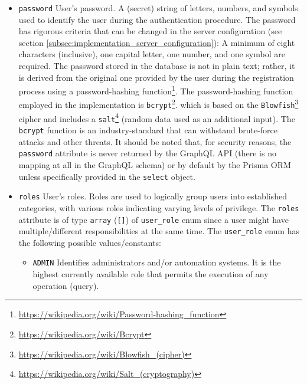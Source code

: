 \begin{itemize}
  \item \texttt{password}
    \newline
    User's password.
    \newline
    A (secret) string of letters, numbers, and symbols used to identify the user
    during the authentication procedure.
    \newline
    The password has rigorous criteria that can be changed in the server
    configuration (see section \ref{subsec:implementation_server_configuration}):
    A minimum of eight characters (inclusive), one capital letter, one number,
    and one symbol are required.
    \newline
    The password stored in the database is not in plain text; rather, it is derived
    from the original one provided by the user during the registration process using
    a password-hashing function\footnote{\url{https://wikipedia.org/wiki/Password-hashing_function}}.
    The password-hashing function employed in the implementation is \texttt{bcrypt}\footnote{\url{https://wikipedia.org/wiki/Bcrypt}}.
    which is based on the \texttt{Blowfish}\footnote{\url{https://wikipedia.org/wiki/Blowfish_(cipher)}}
    cipher and includes a \texttt{salt}\footnote{\url{https://wikipedia.org/wiki/Salt_(cryptography)}}
    (random data used as an additional input). The \texttt{bcrypt} function is
    an industry-standard that can withstand brute-force attacks and other
    threats\cite{bcrypt}.
    \newline
    It should be noted that, for security reasons, the \texttt{password} attribute
    is never returned by the GraphQL API (there is no mapping at all in the
    GraphQL schema) or by default by the Prisma ORM unless specifically provided
    in the \texttt{select} object.

  \item \texttt{roles}
    \newline
    User's roles.
    \newline
    Roles are used to logically group users into established categories, with
    various roles indicating varying levels of privilege.
    \newline
    The \texttt{roles} attribute is of type \texttt{array} (\texttt{[]}) of \texttt{user\_role}
    enum since a user might have multiple/different responsibilities at the same
    time.
    \newline
    The \texttt{user\_role} enum has the following possible values/constants:
    \begin{itemize}
      \item \texttt{ADMIN}
        \newline
        Identifies administrators and/or automation systems.
        \newline
        It is the highest currently available role that permits the execution of
        any operation (query).


\end{itemize}
\end{itemize}
